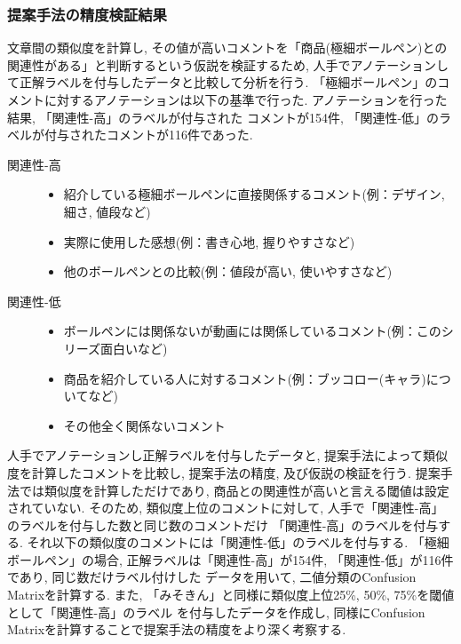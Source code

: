 \documentclass{ltjarticle}
\begin{document}
\subsubsection{提案手法の精度検証結果}
文章間の類似度を計算し, その値が高いコメントを「商品(極細ボールペン)との関連性がある」と判断するという仮説を検証するため, 
人手でアノテーションして正解ラベルを付与したデータと比較して分析を行う. 
「極細ボールペン」のコメントに対するアノテーションは以下の基準で行った. アノテーションを行った結果, 「関連性-高」のラベルが付与された
コメントが154件, 「関連性-低」のラベルが付与されたコメントが116件であった. 
\vspace{10truept}

\begin{description}
    \item[関連性-高]\mbox{}
    \begin{itemize}
        \item 紹介している極細ボールペンに直接関係するコメント(例：デザイン, 細さ, 値段など)
        \item 実際に使用した感想(例：書き心地, 握りやすさなど)
        \item 他のボールペンとの比較(例：値段が高い, 使いやすさなど)
    \end{itemize}
    \item[関連性-低] \mbox{}
    \begin{itemize}
        \item ボールペンには関係ないが動画には関係しているコメント(例：このシリーズ面白いなど)
        \item 商品を紹介している人に対するコメント(例：ブッコロー(キャラ)についてなど)
        \item その他全く関係ないコメント
    \end{itemize}
\end{description}
\vspace{10truept}

人手でアノテーションし正解ラベルを付与したデータと, 提案手法によって類似度を計算したコメントを比較し, 
提案手法の精度, 及び仮説の検証を行う. 
提案手法では類似度を計算しただけであり, 商品との関連性が高いと言える閾値は設定されていない. 
そのため, 類似度上位のコメントに対して, 人手で「関連性-高」のラベルを付与した数と同じ数のコメントだけ
「関連性-高」のラベルを付与する. 
それ以下の類似度のコメントには「関連性-低」のラベルを付与する. 
「極細ボールペン」の場合, 正解ラベルは「関連性-高」が154件, 「関連性-低」が116件であり, 同じ数だけラベル付けした
データを用いて, 二値分類のConfusion Matrixを計算する. 
また, 「みそきん」と同様に類似度上位25\%, 50\%, 75\%を閾値として「関連性-高」のラベル
を付与したデータを作成し, 同様にConfusion Matrixを計算することで提案手法の精度をより深く考察する. 
\vspace{20truept}
\end{document}
